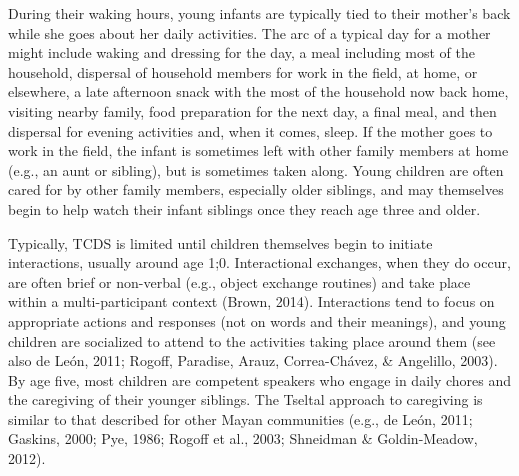 \documentclass[,man,floatsintext]{apa6}
\begin{document}
During their waking hours, young infants are typically tied to their
mother's back while she goes about her daily activities. The arc of a
typical day for a mother might include waking and dressing for the day,
a meal including most of the household, dispersal of household members
for work in the field, at home, or elsewhere, a late afternoon snack
with the most of the household now back home, visiting nearby family,
food preparation for the next day, a final meal, and then dispersal for
evening activities and, when it comes, sleep. If the mother goes to work
in the field, the infant is sometimes left with other family members at
home (e.g., an aunt or sibling), but is sometimes taken along. Young
children are often cared for by other family members, especially older
siblings, and may themselves begin to help watch their infant siblings
once they reach age three and older.

Typically, TCDS is limited until children themselves begin to initiate
interactions, usually around age 1;0. Interactional exchanges, when they
do occur, are often brief or non-verbal (e.g., object exchange routines)
and take place within a multi-participant context (Brown, 2014).
Interactions tend to focus on appropriate actions and responses (not on
words and their meanings), and young children are socialized to attend
to the activities taking place around them (see also de León, 2011;
Rogoff, Paradise, Arauz, Correa-Chávez, \& Angelillo, 2003). By age
five, most children are competent speakers who engage in daily chores
and the caregiving of their younger siblings. The Tseltal approach to
caregiving is similar to that described for other Mayan communities
(e.g., de León, 2011; Gaskins, 2000; Pye, 1986; Rogoff et al., 2003;
Shneidman \& Goldin-Meadow, 2012).
\end{document}
